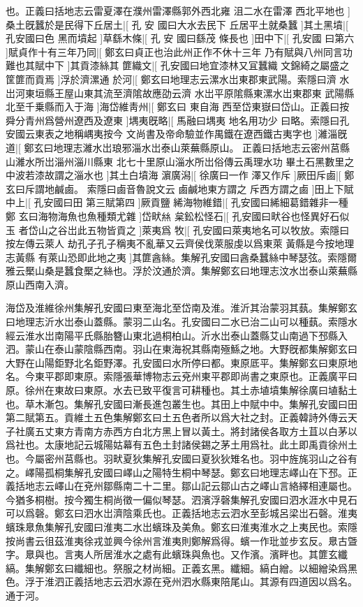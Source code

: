也。正義曰括地志云雷夏澤在濮州雷澤縣郭外西北雍%
%
沮二水在雷澤%
西北平地也%
]桑土旣蠶於是民得下丘居土|[%
孔%
安%
%
國曰大水去民下%
丘居平土就桑蠶%
]其土黑墳|[%
孔安國曰色%
黑而墳起%
]草繇木條|[%
孔%
安%
%
國曰繇茂%
條長也%
]田中下|[%
孔安國%
曰第六%
]賦貞作十有三年乃同|[%
%
鄭玄曰貞正也治此州正作不休十三年%
乃有賦與八州同言功難也其賦中下%
]其貢漆絲其%
篚織文|[%
孔安國曰地宜漆林又冝蠶織%
文錦綺之屬盛之筐篚而貢焉%
]浮於濟漯通%
於河|[%
鄭玄曰地理志云漯水岀東郡東武陽。索隱曰濟%
水岀河東垣縣王屋山東其流至濟隂故應劭云濟%
%
水岀平原隂縣東漯水岀東郡東%
武陽縣北至千乗縣而入于海%
]海岱維靑州|[%
鄭玄曰%
東自海%
%
西至岱東嶽曰岱山。正義曰按%
舜分青州爲營州遼西及遼東%
]堣夷旣略|[%
馬融曰堣夷%
地名用功少%
%
曰略。索隱曰孔安國云東表之地稱嵎夷按今%
文尚書及帝命驗並作禺鐵在遼西鐵古夷字也%
]濰淄旣%
道|[%
鄭玄曰地理志濰水岀琅邪淄水岀泰山萊蕪縣原山。%
正義曰括地志云密州莒縣山濰水所岀淄州淄川縣東%
%
北七十里原山淄水所岀俗傳云禹理水功%
畢土石黑數里之中波若漆故謂之淄水也%
]其土白墳海%
濵廣潟|[%
徐廣曰一作%
澤又作斥%
]厥田斥鹵|[%
鄭玄曰斥謂地鹹鹵。%
索隱曰鹵音魯說文云%
%
鹵鹹地東方謂之%
斥西方謂之鹵%
]田上下賦中上|[%
孔安國曰田%
第三賦第四%
]厥貢鹽%
絺海物維錯|[%
孔安國曰絺細葛錯雜非一種鄭%
玄曰海物海魚也魚種類尤雜%
]岱畎𢇁%
枲鈆松怪石|[%
孔安國曰畎谷也怪異好石似玉%
者岱山之谷岀此五物皆貢之%
]萊夷爲%
牧|[%
孔安國曰萊夷地名可以牧放。索隱曰按左傳云萊人%
劫孔子孔子稱夷不亂華又云齊侯伐萊服虔以爲東萊%
%
黃縣是今按地理志黃縣%
有萊山恐即此地之夷%
]其篚酓絲。集解孔安國曰酓桑蠶絲中琴瑟弦。索隱爾雅云檿山桑是蠶食檿之絲也。浮於汶通於濟。集解鄭玄曰地理志汶水岀泰山萊蕪縣原山西南入濟。

海岱及淮維徐州集解孔安國曰東至海北至岱南及淮。淮沂其治蒙羽其蓺。集解鄭玄曰地理志沂水岀泰山蓋縣。蒙羽二山名。孔安國曰二水已治二山可以種蓺。索隱水經云淮水岀南陽平氏縣胎簪山東北過桐柏山。沂水岀泰山蓋縣艾山南過下邳縣入泗。蒙山在泰山蒙陰縣西南。羽山在東海祝其縣南殛鯀之地。大野旣都集解鄭玄曰大野在山陽鉅野北名鉅野澤。孔安國曰水所停曰都。東原厎平。集解鄭玄曰東原地名。今東平郡即東原。索隱張華博物志云兗州東平郡即尚書之東原也。正義廣平曰原。徐州在東故曰東原。水去已致平復言可耕種也。其土赤埴墳集解徐廣曰埴黏土也。草木漸包。集解孔安國曰漸長進包叢生也。其田上中賦中中。集解孔安國曰田第二賦第五。貢維土五色集解鄭玄曰土五色者所以爲大社之封。正義韓詩外傳云天子社廣五丈東方青南方赤西方白北方黑上冒以黃土。將封諸侯各取方土苴以白茅以爲社也。太康地記云城陽姑幕有五色土封諸侯錫之茅土用爲社。此土即禹貢徐州土也。今屬密州莒縣也。羽畎夏狄集解孔安國曰夏狄狄雉名也。羽中旌旄羽山之谷有之。嶧陽孤桐集解孔安國曰嶧山之陽特生桐中琴瑟。鄭玄曰地理志嶧山在下邳。正義括地志云嶧山在兗州鄒縣南二十二里。鄒山記云鄒山古之嶧山言絡繹相連屬也。今猶多桐樹。按今獨生桐尚徵一偏似琴瑟。泗濱浮磬集解孔安國曰泗水涯水中見石可以爲磬。鄭玄曰泗水岀濟陰乘氏也。正義括地志云泗水至彭城呂梁岀石磬。淮夷蠙珠臮魚集解孔安國曰淮夷二水岀蠙珠及美魚。鄭玄曰淮夷淮水之上夷民也。索隱按尚書云徂茲淮夷徐戎並興今徐州言淮夷則鄭解爲得。蠙一作玭並步玄反。臮古曁字。臮與也。言夷人所居淮水之處有此蠙珠與魚也。又作濱。濱畔也。其篚玄纖縞。集解鄭玄曰纖細也。祭服之材尚細。正義玄黑。纖細。縞白繒。以細繒染爲黑色。浮于淮泗正義括地志云泗水源在兗州泗水縣東陪尾山。其源有四道因以爲名。通于河。

